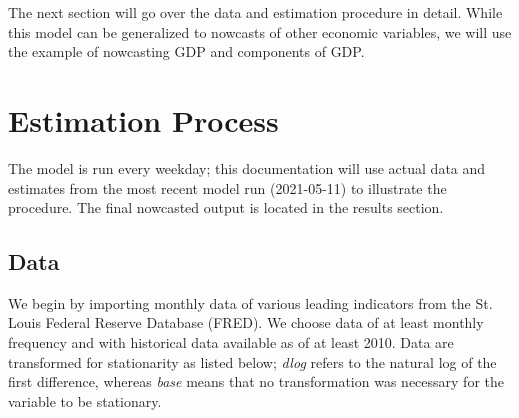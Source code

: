 \documentclass[11pt, letterpaper]{article}\usepackage[]{graphicx}\usepackage[]{color}
\begin{document}
The next section will go over the data and estimation procedure in detail. While this model can be generalized to nowcasts of other economic variables, we will use the example of nowcasting GDP and components of GDP.

\newpage
\section{Estimation Process}
The model is run every weekday; this documentation will use actual data and estimates from the most recent model run (2021-05-11) to illustrate the procedure. The final nowcasted output is located in the results section.

\subsection{Data}
We begin by importing monthly data of various leading indicators from the St. Louis Federal Reserve Database (FRED). We choose data of at least monthly frequency and with historical data available as of at least 2010. Data are transformed for stationarity as listed below; \textit{dlog} refers to the natural log of the first difference, whereas \textit{base} means that no transformation was necessary for the variable to be stationary.
\end{document}
